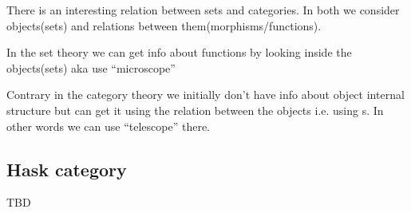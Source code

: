 \begin{remark}
\label{rem:set_vs_category}
There is an interesting relation between sets and categories. In both
we consider objects(sets) and relations between
them(morphisms/functions). 

In the set theory we can get info about functions by looking inside
the objects(sets) aka use ``microscope'' \cite{bib:milewski2018category} 

Contrary in the category theory we initially don't have info about object
internal structure but can get it using the relation between the
objects i.e. using s. In other words we can use
``telescope'' \cite{bib:milewski2018category}  there.
\end{remark}

\subsection{\textbf{Hask} category}
TBD
